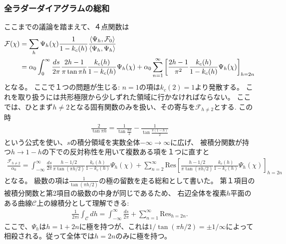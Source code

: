 \subsubsection{全ラダーダイアグラムの総和}
ここまでの議論を踏まえて、４点関数は
\begin{align}
	\mathcal{F}(\chi)
	&= \sum_h\Psi_h(\chi)\frac{1}{1 - k_c(h)}
		\frac{\langle \Psi_h, \mathcal{F}_0 \rangle}{\langle \Psi_h, \Psi_h \rangle}\nonumber\\
	&= \alpha_0\int_0^{\infty}\frac{ds}{2\pi}\frac{2h-1}{\pi\tan\pi h}
		\frac{k_c(h)}{1-k_c(h)}\Psi_h(\chi)
	+ \alpha_0\sum_{n=1}^{\infty}\left[
		\frac{2h-1}{\pi^2}\frac{k_c(h)}{1-k_c(h)}\Psi_h(\chi)
	\right]_{h=2n}
	\label{eq:all_sum_of_ladders}
\end{align}
となる。
ここで１つの問題が生じる: $n = 1$の項は$k_c(2) = 1$より発散する。
これを取り扱うには共形極限から少しずれた領域に行かなければならない。
ここでは、ひとまず$h\neq2$となる固有関数のみを扱い、その寄与を$\mathcal{F}_{h\neq2}$とする.
この時
\begin{align}
	\frac{2}{\tan\pi h} = \frac{1}{\tan\frac{\pi h}{2}} - \frac{1}{\tan\frac{\pi(1-h)}{2}}
\end{align}
という公式を使い、$s$の積分領域を実数全体$-\infty\to\infty$に広げ、
被積分関数が持つ$h\to1-h$の下での反対称性を用いて複数ある項を１つに直すと
\begin{align}
	\frac{\mathcal{F}_{h\neq2}}{\alpha_0}
	= \int_{-\infty}^{\infty}\frac{ds}{2\pi}\frac{h - 1/2}{\pi\tan(\pi h / 2)}
		\frac{k_c(h)}{1-k_c(h)}\Psi_h(\chi)
	+ \sum_{n=2}^{\infty}\mathrm{Res}\left[
			\frac{h-1/2}{\pi\tan(\pi h/2)}\frac{k_c(h)}{1-k_c(h)}\Psi_h(\chi)
		\right]_{h=2n}
\end{align}
となる。
級数の項は$\frac{1}{\tan(\pi h/2)}$の極の留数を走る総和として書いた。
第１項目の被積分関数と第2項目の級数の中身が同じであるため、
右辺全体を複素$h$平面のある曲線$\mathcal{C}$上の線積分として理解できる:
\begin{align}
	\frac{1}{2\pi i}\int_{\mathcal{C}}dh
	= \int_{-\infty}^{\infty}\frac{ds}{2\pi}
	+ \sum_{n=1}^{\infty}\mathrm{Res}_{h=2n}.
\end{align}
ここで、$\Psi_h$は$h = 1 + 2n$に極を持つが、これは$1/\tan(\pi h / 2) = \pm 1/\infty$によって
相殺される。従って全体では$h = 2n$のみに極を持つ。

